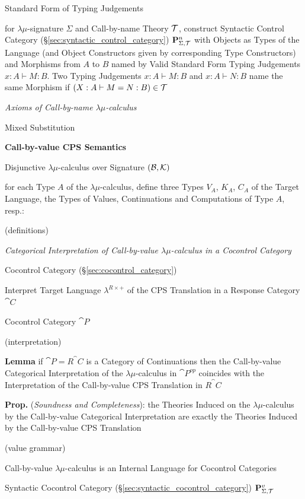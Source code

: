 Standard Form of Typing Judgements %

for $\lambda\mu$-signature $\Sigma$ and Call-by-name Theory
$\mathcal{T}$, construct Syntactic Control Category
(\S\ref{sec:syntactic_control_category})
$\mathbf{P}^n_{\Sigma,\mathcal{T}}$ with Objects as Types of the Language
(and Object Constructors given by corresponding Type Constructors) and
Morphisms from $A$ to $B$ named by Valid Standard Form Typing
Judgements $x:A \vdash M:B$. Two Typing Judgements $x:A \vdash M:B$
and $x:A \vdash N:B$ name the same Morphism if $(X:A \vdash M=N:B) \in
\mathcal{T}$


\emph{Axioms of Call-by-name $\lambda\mu$-calculus} %

Mixed Substitution


\textbf{Call-by-value CPS Semantics}

Disjunctive $\lambda\mu$-calculus over Signature
$(\mathcal{B},\mathcal{K})$

for each Type $A$ of the $\lambda\mu$-calculus, define three Types
$V_A$, $K_A$, $C_A$ of the Target Language, the Types of Values,
Continuations and Computations of Type $A$, resp.:

(definitions) %

\emph{Categorical Interpretation of Call-by-value $\lambda\mu$-calculus
  in a Cocontrol Category}

Cocontrol Category (\S\ref{sec:cocontrol_category})

Interpret Target Language $\lambda^{R\times+}$ of the CPS Translation
in a Response Category $\cat{C}$

Cocontrol Category $\cat{P}$

(interpretation) %

\textbf{Lemma} if $\cat{P} = R^\cat{C}$ is a Category of Continuations
then the Call-by-value Categorical Interpretation of the
$\lambda\mu$-calculus in $\cat{P}^{op}$ coincides with the
Interpretation of the Call-by-value CPS Translation in $R^\cat{C}$

\textbf{Prop.} (\emph{Soundness and Completeness}): the Theories
Induced on the $\lambda\mu$-calculus by the Call-by-value Categorical
Interpretation are exactly the Theories Induced by the Call-by-value
CPS Translation

(value grammar) %

Call-by-value $\lambda\mu$-calculus is an Internal Language for
Cocontrol Categories

Syntactic Cocontrol Category
(\S\ref{sec:syntactic_cocontrol_category})
$\mathbf{P}^v_{\Sigma,\mathcal{T}}$ %


